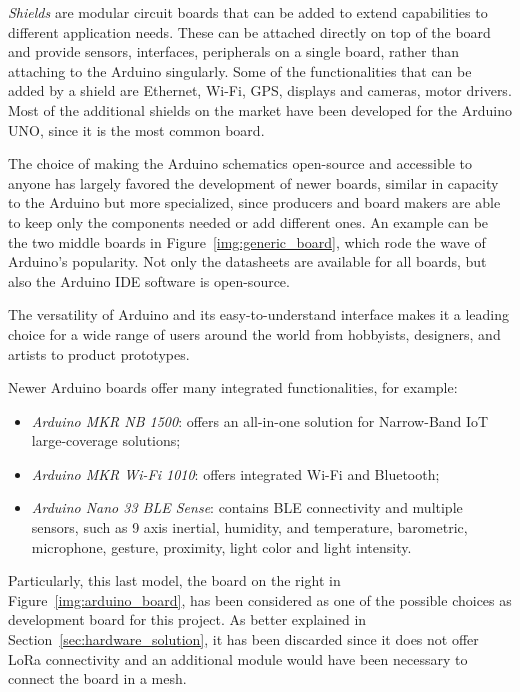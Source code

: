 			\textit{Shields} are modular circuit boards that can be added to extend capabilities to different application needs.
			These can be attached directly on top of the board and provide sensors, interfaces, peripherals on a single board, rather than attaching to the Arduino singularly.
			Some of the functionalities that can be added by a shield are Ethernet, Wi-Fi, GPS, displays and cameras, motor drivers.
			Most of the additional shields on the market have been developed for the Arduino UNO, since it is the most common board.
			
			The choice of making the Arduino schematics open-source and accessible to anyone has largely favored the development of newer boards, similar in capacity to the Arduino but more specialized, since producers and board makers are able to keep only the components needed or add different ones.
			An example can be the two middle boards in Figure~\ref{img:generic_board}, which rode the wave of Arduino's popularity.
			Not only the datasheets are available for all boards, but also the Arduino IDE software is open-source.
			
			The versatility of Arduino and its easy-to-understand interface makes it a leading choice for a wide range of users around the world from hobbyists, designers, and artists to product prototypes. 
			
			Newer Arduino boards offer many integrated functionalities, for example:
			\begin{itemize}
				\item \textit{Arduino MKR NB 1500}: offers an all-in-one solution for Narrow-Band IoT large-coverage solutions;
				\item \textit{Arduino MKR Wi-Fi 1010}: offers integrated Wi-Fi and Bluetooth;
				\item \textit{Arduino Nano 33 BLE Sense}: contains BLE connectivity and multiple sensors, such as 9 axis inertial, humidity, and temperature, barometric, microphone, gesture, proximity, light color and light intensity.
			\end{itemize}
		
			Particularly, this last model, the board on the right in Figure~\ref{img:arduino_board}, has been considered as one of the possible choices as development board for this project.
			As better explained in Section~\ref{sec:hardware_solution}, it has been discarded since it does not offer LoRa connectivity and an additional module would have been necessary to connect the board in a mesh.
								
